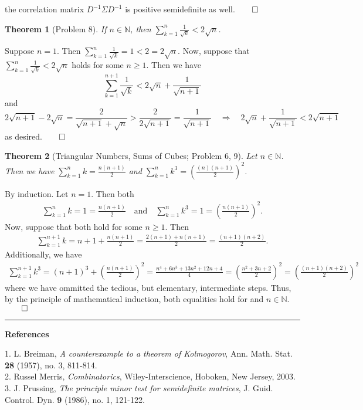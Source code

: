\documentclass[10pt]{article}
\newcommand{\bp}[1]{\left({#1}\right)}
\newcommand{\mbb}[1]{\mathbb{#1}}
\newcommand{\1}[1]{\mathbbm{1}_{#1}}
\newtheorem{theorem}{Theorem}
\begin{document}
    the correlation matrix $D^{-1}\Sigma D^{-1}$ is positive semidefinite as well.\hfill{$\qed$}\\[5pt]
    \begin{theorem}[Problem 8]
        If $n\in\mbb{N}$, then $\sum_{k=1}^n\tfrac{1}{\sqrt{k}}<2\sqrt{n}$.
    \end{theorem}
    \hspace{5pt} Suppose $n=1$. Then $\sum_{k=1}^n\tfrac{1}{\sqrt{k}}=1<2=2\sqrt{n}$. Now, suppose that $\sum_{k=1}^n\tfrac{1}{\sqrt{k}}<2\sqrt{n}$ holds for some $n\geq 1$. Then we have
    \[\sum_{k=1}^{n+1}\frac{1}{\sqrt{k}}<2\sqrt{n}+\frac{1}{\sqrt{n+1}}\]
    and
    \[2\sqrt{n+1}-2\sqrt{n}=\frac{2}{\sqrt{n+1}+\sqrt{n}}>\frac{2}{2\sqrt{n+1}}=\frac{1}{\sqrt{n+1}}\quad\Rightarrow\quad 2\sqrt{n}+\frac{1}{\sqrt{n+1}}<2\sqrt{n+1}\]
    as desired.\hfill{$\qed$}\\[5pt]
    \begin{theorem}[Triangular Numbers, Sums of Cubes; Problem 6, 9]
        Let $n\in\mbb{N}$. Then we have $\sum_{k=1}^nk=\tfrac{n(n+1)}{2}$ and $\sum_{k=1}^nk^3=\bp{\tfrac{(n)(n+1)}{2}}^2$. 
    \end{theorem}
     By induction. Let $n=1$. Then both
    \begin{align*}    
        \sum_{k=1}^nk=1=\frac{n(n+1)}{2}\quad\text{and}\quad\sum_{k=1}^nk^3=1=\bp{\frac{n(n+1)}{2}}^2.
    \end{align*}
    Now, suppose that both hold for some $n\geq 1$. Then
    \begin{align*}
        \sum_{k=1}^{n+1}k=n+1+\frac{n(n+1)}{2}=\frac{2(n+1)+n(n+1)}{2}=\frac{(n+1)(n+2)}{2}.
    \end{align*}
    Additionally, we have
    \begin{align*}
        \sum_{k=1}^{n+1}k^3=(n+1)^3+\bp{\frac{n(n+1)}{2}}^2=\frac{n^4+6n^3+13n^2+12n+4}{4}=\bp{\frac{n^2+3n+2}{2}}^2=\bp{\frac{(n+1)(n+2)}{2}}^2
    \end{align*}
    where we have ommitted the tedious, but elementary, intermediate steps. Thus, by the principle of mathematical induction, both equalities hold for and $n\in\mbb{N}$.\hfill{$\qed$}\\[5pt]
    \hrule
    \begin{center}
        {\bf\large References}
    \end{center}
    1. L. Breiman, {\it A counterexample to a theorem of Kolmogorov}, Ann. Math. Stat. {\bf 28} (1957), no. 3, 811-814.\\[5pt]
    2. Russel Merris, {\it Combinatorics}, Wiley-Interscience, Hoboken, New Jersey, 2003. \\[5pt]
    3. J. Prussing, {\it The principle minor test for semidefinite matrices}, J. Guid. Control. Dyn. {\bf 9} (1986), no. 1, 121-122.
\end{document}
